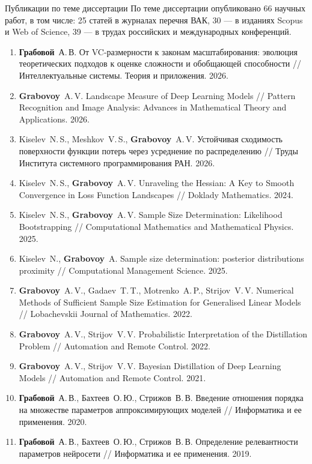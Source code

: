 \documentclass[9pt,pdf,hyperref={unicode}]{beamer}
\begin{document}
\begin{frame}{Публикации по теме диссертации}
\justifying
\normalsize
По теме диссертации опубликовано 66 научных работ, в том числе: 25 статей в журналах перечня ВАК, 30 --- в изданиях Scopus и Web of Science, 39 --- в трудах российских и международных конференций.
\begin{enumerate}
\tiny
\setlength{\leftmargin}{1.2em}
\setlength{\itemsep}{-0.6pt}
    \item \textbf{Грабовой}~А.\,В. От VC-размерности к законам масштабирования: эволюция теоретических подходов к оценке сложности и обобщающей способности // Интеллектуальные системы. Теория и приложения. 2026.
    \item \textbf{Grabovoy}~A.\,V. Landscape Measure of Deep Learning Models // Pattern Recognition and Image Analysis: Advances in Mathematical Theory and Applications. 2026.
    \item Kiselev~N.\,S., Meshkov~V.\,S., \textbf{Grabovoy}~A.\,V. Устойчивая сходимость поверхности функции потерь через усреднение по распределению // Труды Института системного программирования РАН. 2026.
    \item Kiselev~N.\,S., \textbf{Grabovoy}~A.\,V. Unraveling the Hessian: A Key to Smooth Convergence in Loss Function Landscapes // Doklady Mathematics. 2024.
    \item Kiselev~N.\,S., \textbf{Grabovoy}~A.\,V. Sample Size Determination: Likelihood Bootstrapping // Computational Mathematics and Mathematical Physics. 2025.
    \item Kiselev~N., \textbf{Grabovoy}~A. Sample size determination: posterior distributions proximity // Computational Management Science. 2025.
    \item \textbf{Grabovoy}~A.\,V., Gadaev~T.\,T., Motrenko~A.\,P., Strijov~V.\,V. Numerical Methods of Sufficient Sample Size Estimation for Generalised Linear Models // Lobachevskii Journal of Mathematics. 2022.
    \item \textbf{Grabovoy}~A.\,V., Strijov~V.\,V. Probabilistic Interpretation of the Distillation Problem // Automation and Remote Control. 2022.
    \item \textbf{Grabovoy}~A.\,V., Strijov~V.\,V. Bayesian Distillation of Deep Learning Models // Automation and Remote Control. 2021.
    \item \textbf{Грабовой}~А.\,В., Бахтеев~О.\,Ю., Стрижов~В.\,В. Введение отношения порядка на множестве параметров аппроксимирующих моделей // Информатика и ее применения. 2020.
    \item \textbf{Грабовой}~А.\,В., Бахтеев~О.\,Ю., Стрижов~В.\,В. Определение релевантности параметров нейросети // Информатика и ее применения. 2019.

\end{enumerate}
\end{frame}
\end{document}
